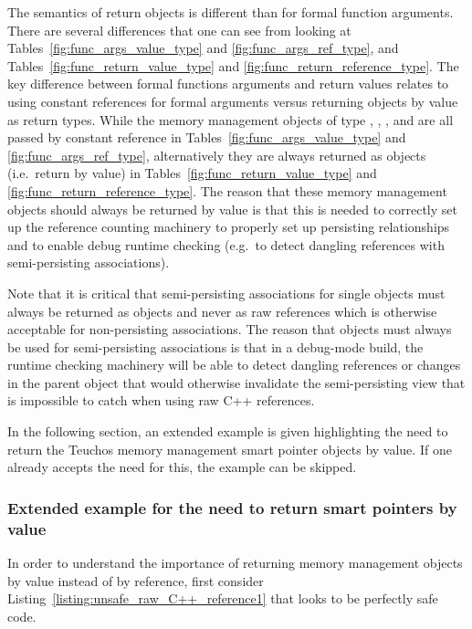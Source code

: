 \documentclass[pdf,ps2pdf,11pt]{SANDreport}
\begin{document}
The semantics of return objects is different than for formal function
arguments.  There are several differences that one can see from
looking at Tables~\ref{fig:func_args_value_type} and
{}\ref{fig:func_args_ref_type}, and
Tables~\ref{fig:func_return_value_type} and
{}\ref{fig:func_return_reference_type}.  The key difference between
formal functions arguments and return values relates to using constant
references for formal arguments versus returning objects by value as
return types.  While the memory management objects of type
{}, {}, {}, and {} are
all passed by constant reference in
Tables~\ref{fig:func_args_value_type} and
{}\ref{fig:func_args_ref_type}, alternatively they are always returned
as objects (i.e.\ return by value) in
Tables~\ref{fig:func_return_value_type} and
{}\ref{fig:func_return_reference_type}.  The reason that these memory
management objects should always be returned by value is that this is
needed to correctly set up the reference counting machinery to
properly set up persisting relationships and to enable debug runtime
checking (e.g.\ to detect dangling references with semi-persisting
associations).

Note that it is critical that semi-persisting associations for single
objects must always be returned as {} objects and never as
raw references {} which is otherwise acceptable for
non-persisting associations.  The reason that {} objects
must always be used for semi-persisting associations is that in a
debug-mode build, the runtime checking machinery will be able to
detect dangling references or changes in the parent object that would
otherwise invalidate the semi-persisting view that is impossible to
catch when using raw C++ references.

In the following section, an extended example is given highlighting
the need to return the Teuchos memory management smart pointer objects
by value.  If one already accepts the need for this, the example can
be skipped.

%
{}\subsubsection*{Extended example for the need to return smart pointers by value}
%

In order to understand the importance of returning memory management
objects by value instead of by reference, first consider
Listing~\ref{listing:unsafe_raw_C++_reference1} that looks to be
perfectly safe code.
\end{document}

